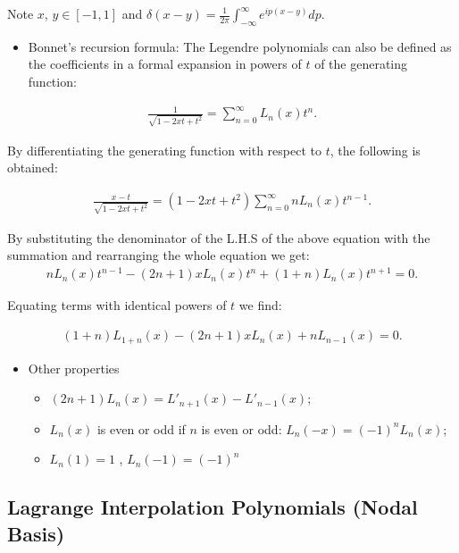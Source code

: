 \documentclass[
  a4paper,
  10pt]{article}
\providecommand{\tightlist}{%
  \setlength{\itemsep}{0pt}\setlength{\parskip}{0pt}}
\begin{document}
Note \(x\), \(y\in [-1,1]\) and
\(\delta(x-y) = \frac{1}{2\pi}\int_{-\infty}^{\infty}e^{ip(x-y)}dp\).

\begin{itemize}
\tightlist
\item
  Bonnet's recursion formula: The Legendre polynomials can also be
  defined as the coefficients in a formal expansion in powers of \(t\)
  of the generating function:
\end{itemize}

\begin{align}
\frac{1}{\sqrt{1-2xt+t^2}} = \sum_{n=0}^{\infty}L_n(x)t^n.
\end{align}

By differentiating the generating function with respect to \(t\), the following is obtained:

\begin{align}
\frac{x-t}{\sqrt{1-2xt+t^2}} = (1-2xt+t^2)\sum_{n=0}^{\infty}nL_n(x)t^{n-1}.
\end{align}

By substituting the denominator of the L.H.S of the above equation with
the summation and rearranging the whole equation we get: \begin{align}
nL_n(x)t^{n-1} - (2n+1)xL_n(x)t^n + (1+n)L_n(x)t^{n+1} = 0.
\end{align}

Equating terms with identical powers of \(t\) we find:

\begin{align}
(1+n)L_{1+n}(x) - (2n+1)xL_n(x) + nL_{n-1}(x) = 0.
\end{align}

\begin{itemize}
\tightlist
\item
  Other properties

  \begin{itemize}
  \tightlist
  \item
    \((2n+1)L_n(𝑥)=L'_{n+1}(x)−L'_{n−1}(x)\);
  \item
    \(L_n(x)\) is even or odd if \(n\) is even or odd:
    \(L_{n}(-x)=(-1)^{n}L_{n}(x)\);
  \item
    \(L_n(1)=1\) , \(L_n(−1)=(−1)^n\)
  \end{itemize}
\end{itemize}

\hypertarget{lagrange-interpolation-polynomials-nodal-basis}{%
\subsection{Lagrange Interpolation Polynomials (Nodal
Basis)}\label{lagrange-interpolation-polynomials-nodal-basis}}
\end{document}
